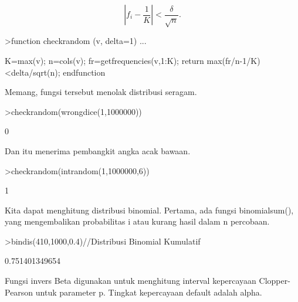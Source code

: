 \documentclass[a4paper,10pt]{article}
\begin{document}
\begin{eulernotebook}
\begin{eulercomment}
\end{eulercomment}
\begin{eulerformula}
\[
\left|f_i-\frac{1}{K}\right| < \frac{\delta}{\sqrt{n}}.
\]
\end{eulerformula}
\begin{eulerprompt}
>function checkrandom (v, delta=1) ...
\end{eulerprompt}
\begin{eulerudf}
    K=max(v); n=cols(v);
    fr=getfrequencies(v,1:K);
    return max(fr/n-1/K)<delta/sqrt(n);
    endfunction
\end{eulerudf}
\begin{eulercomment}
Memang, fungsi tersebut menolak distribusi seragam.
\end{eulercomment}
\begin{eulerprompt}
>checkrandom(wrongdice(1,1000000))
\end{eulerprompt}
\begin{euleroutput}
  0
\end{euleroutput}
\begin{eulercomment}
Dan itu menerima pembangkit angka acak bawaan.
\end{eulercomment}
\begin{eulerprompt}
>checkrandom(intrandom(1,1000000,6))
\end{eulerprompt}
\begin{euleroutput}
  1
\end{euleroutput}
\begin{eulercomment}
Kita dapat menghitung distribusi binomial. Pertama, ada fungsi
binomialsum(), yang mengembalikan probabilitas i atau kurang hasil
dalam n percobaan.
\end{eulercomment}
\begin{eulerprompt}
>bindis(410,1000,0.4)//Distribusi Binomial Kumulatif
\end{eulerprompt}
\begin{euleroutput}
  0.751401349654
\end{euleroutput}
\begin{eulercomment}
Fungsi invers Beta digunakan untuk menghitung interval kepercayaan
Clopper-Pearson untuk parameter p. Tingkat kepercayaan default adalah
alpha.


\end{eulercomment}
\end{eulernotebook}
\end{document}
